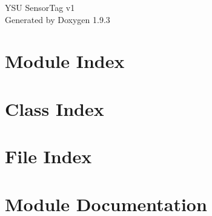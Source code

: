 \documentclass[twoside]{book}
\newcommand{\+}{\discretionary{\mbox{\scriptsize$\hookleftarrow$}}{}{}}
\newcommand{\clearemptydoublepage}{%
    \newpage{\pagestyle{empty}\cleardoublepage}%
  }
\begin{document}
  \raggedbottom
    \hypersetup{pageanchor=false,
                bookmarksnumbered=true,
                pdfencoding=unicode
               }
  \begin{titlepage}
  \vspace*{7cm}
  \begin{center}%
  {\Large YSU Sensor\+Tag v1}\\
  \vspace*{1cm}
  {\large Generated by Doxygen 1.9.3}\\
  \end{center}
  \end{titlepage}
  \clearemptydoublepage
  \tableofcontents
  \clearemptydoublepage
  \hypersetup{pageanchor=true}
\chapter{Module Index}

\chapter{Class Index}

\chapter{File Index}

\chapter{Module Documentation}








\end{document}
